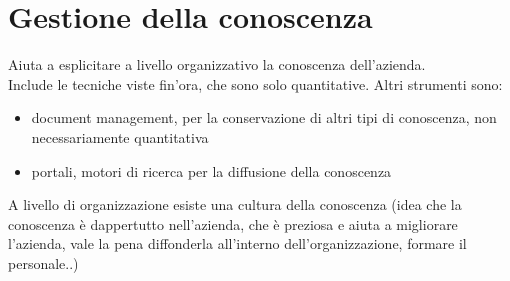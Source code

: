 \section{Gestione della conoscenza}\label{gestione-della-conoscenza}

Aiuta a esplicitare a livello organizzativo la conoscenza dell'azienda.\\
Include le tecniche viste fin'ora, che sono solo quantitative. Altri strumenti sono:

\begin{itemize}

\item
  document management, per la conservazione di altri tipi di conoscenza,
  non necessariamente quantitativa
\item
  portali, motori di ricerca per la diffusione della conoscenza
\end{itemize}

A livello di organizzazione esiste una cultura della conoscenza (idea
che la conoscenza \`e dappertutto nell'azienda, che \`e preziosa e aiuta a
migliorare l'azienda, vale la pena diffonderla all'interno
dell'organizzazione, formare il personale..)
